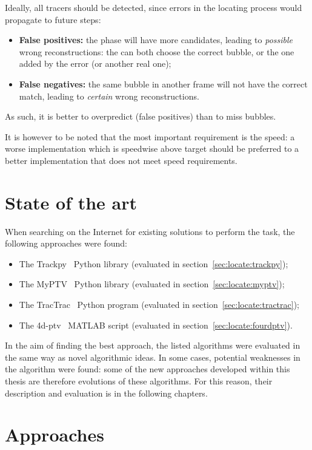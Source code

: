 Ideally, all tracers should be detected, since errors in the locating process would propagate to future steps:
\begin{itemize}
	\itemsep 0em
	\item \textbf{False positives:} the \match* phase will have more candidates, leading to \textit{possible} wrong reconstructions: the \match* can both choose the correct bubble, or the one added by the error (or another real one);
	\item \textbf{False negatives:} the same bubble in another frame will not have the correct match, leading to \textit{certain} wrong reconstructions.
\end{itemize}
As such, it is better to overpredict (false positives) than to miss bubbles.

It is however to be noted that the most important requirement is the speed: a worse implementation which is speedwise above target should be preferred to a better implementation that does not meet speed requirements.

\section{State of the art}

When searching on the Internet for existing solutions to perform the \locate* task, the following approaches were found:
\begin{itemize}
	\itemsep 0em
	\item The Trackpy~\cite{trackpy} Python library (evaluated in section~\ref{sec:locate:trackpy});
	\item The MyPTV~\cite{myptv} Python library (evaluated in section~\ref{sec:locate:myptv});
	\item The TracTrac~\cite{tractrac} Python program (evaluated in section~\ref{sec:locate:tractrac});
	\item The 4d-ptv~\cite{fourdptv} MATLAB script (evaluated in section~\ref{sec:locate:fourdptv}).
\end{itemize}
In the aim of finding the best approach, the listed algorithms were evaluated in the same way as novel algorithmic ideas.
In some cases, potential weaknesses in the algorithm were found: some of the new approaches developed within this thesis are therefore evolutions of these algorithms.
For this reason, their description and evaluation is in the following chapters.

\section{Approaches}
\label{sec:locate:approaches}

